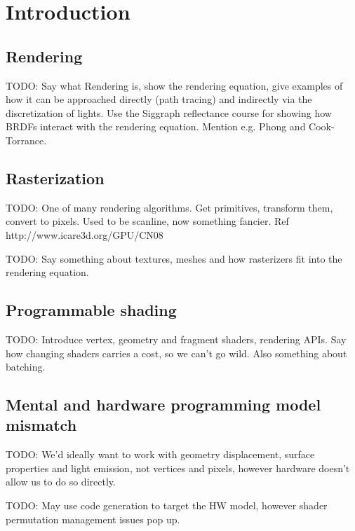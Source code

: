 
\chapter{ Introduction }
\label{Chapter1}

\section{Rendering}

TODO: Say what Rendering is, show the rendering equation, give examples of how it can be approached directly (path tracing) and indirectly via the discretization of lights. Use the Siggraph reflectance course for showing how BRDFs interact with the rendering equation. Mention e.g. Phong and Cook-Torrance.

\section{Rasterization}

TODO: One of many rendering algorithms. Get primitives, transform them, convert to pixels. Used to be scanline, now something fancier. Ref http://www.icare3d.org/GPU/CN08

TODO: Say something about textures, meshes and how rasterizers fit into the rendering equation.

\section{Programmable shading}

TODO: Introduce vertex, geometry and fragment shaders, rendering APIs. Say how changing shaders carries a cost, so we can't go wild. Also something about batching.

\section{Mental and hardware programming model mismatch}

TODO: We'd ideally want to work with geometry displacement, surface properties and light emission, not vertices and pixels, however hardware doesn't allow us to do so directly.

TODO: May use code generation to target the HW model, however shader permutation management issues pop up.
